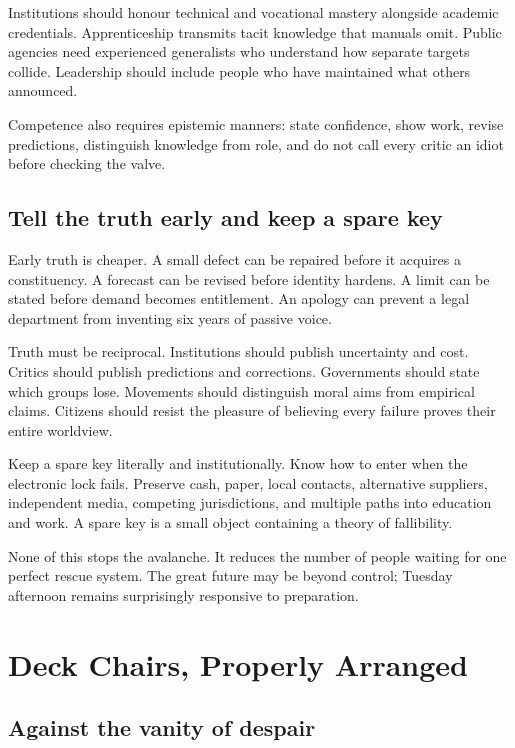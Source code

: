 \documentclass[12pt,a4paper]{book}
\begin{document}
Institutions should honour technical and vocational mastery alongside academic
credentials.  Apprenticeship transmits tacit knowledge that manuals omit.
Public agencies need experienced generalists who understand how separate
targets collide.  Leadership should include people who have maintained what
others announced.

Competence also requires epistemic manners: state confidence, show work, revise
predictions, distinguish knowledge from role, and do not call every critic an
idiot before checking the valve.

\section{Tell the truth early and keep a spare key}

Early truth is cheaper.  A small defect can be repaired before it acquires a
constituency.  A forecast can be revised before identity hardens.  A limit can
be stated before demand becomes entitlement.  An apology can prevent a legal
department from inventing six years of passive voice.

Truth must be reciprocal.  Institutions should publish uncertainty and cost.
Critics should publish predictions and corrections.  Governments should state
which groups lose.  Movements should distinguish moral aims from empirical
claims.  Citizens should resist the pleasure of believing every failure proves
their entire worldview.

Keep a spare key literally and institutionally.  Know how to enter when the
electronic lock fails.  Preserve cash, paper, local contacts, alternative
suppliers, independent media, competing jurisdictions, and multiple paths into
education and work.  A spare key is a small object containing a theory of
fallibility.

None of this stops the avalanche.  It reduces the number of people waiting for
one perfect rescue system.  The great future may be beyond control; Tuesday
afternoon remains surprisingly responsive to preparation.

\chapter{Deck Chairs, Properly Arranged}
\label{chap:deck-chairs}

\section{Against the vanity of despair}
\end{document}
